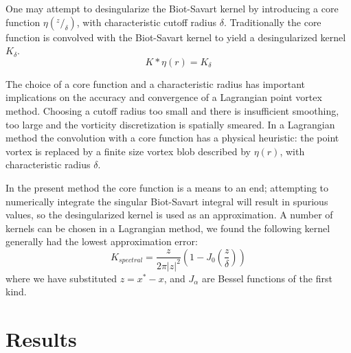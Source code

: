 \documentclass[]{aiaa-tc}%
\newcommand{\ben}[1]{\begin{equation}\label{#1}}
\newcommand{\ee}{\end{equation}}
\begin{document}
One may attempt to desingularize the Biot-Savart kernel by introducing a core function $\eta(^z/_{\delta})$, with characteristic cutoff radius $\delta$. Traditionally the core function is convolved with the Biot-Savart kernel to yield a desingularized kernel $K_{\delta}$.
\ben{DesingBS} K*\eta(r) = K_{\delta} \ee

The choice of a core function and a characteristic radius has important implications on the accuracy and convergence of a Lagrangian point vortex method. Choosing a cutoff radius too small and there is insufficient smoothing, too large and the vorticity discretization is spatially smeared. In a Lagrangian method the convolution with a core function has a physical heuristic: the point vortex is replaced by a finite size vortex blob described by $\eta(r)$, with characteristic radius $\delta$. 

In the present method the core function is a means to an end; attempting to numerically integrate the singular Biot-Savart integral will result in spurious values, so the desingularized kernel is used as an approximation. A number of kernels can be chosen in a Lagrangian method, we found the following kernel\cite{WL} generally had the lowest approximation error:
\ben{PSkern0}  K_{spectral}= \frac{z}{2 \pi |z|^2} (1-J_0(\frac{z}{\delta})) \ee
where we have substituted $z=x^*-x$, and $J_\alpha$ are Bessel functions of the first kind. 

\section{Results}
\end{document}
